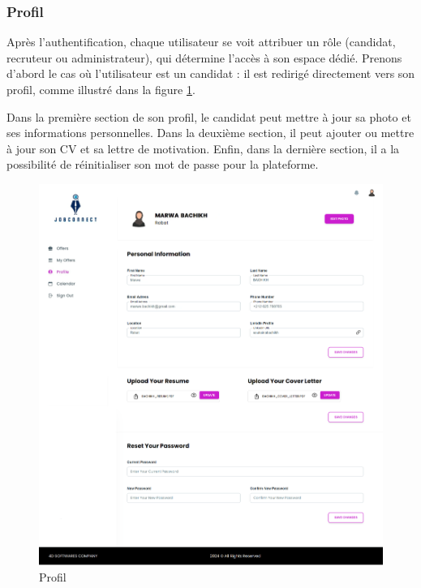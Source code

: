 \subsubsection{Profil}
Après l'authentification, chaque utilisateur se voit attribuer 
un  rôle (candidat, recruteur ou administrateur),  qui  
détermine  l'accès  à son  espace dédié. Prenons d'abord le cas 
où l'utilisateur est un candidat : il est redirigé directement 
vers son profil, comme illustré dans la figure \ref{fig:profile}.
\newline

Dans la première section de son profil, le  candidat peut mettre 
à jour sa photo et ses informations personnelles. Dans la 
deuxième section, il  peut ajouter ou mettre à jour son CV et 
sa lettre  de  motivation.  Enfin,  dans  la  dernière section, 
il a la possibilité de réinitialiser son mot de passe pour la 
plateforme.
\newline


\begin{figure}[htbp]
   \centering
   \includegraphics[scale=0.3]{screens/profill.png} 
   \caption{Profil}
   \label{fig:profile}
\end{figure}

